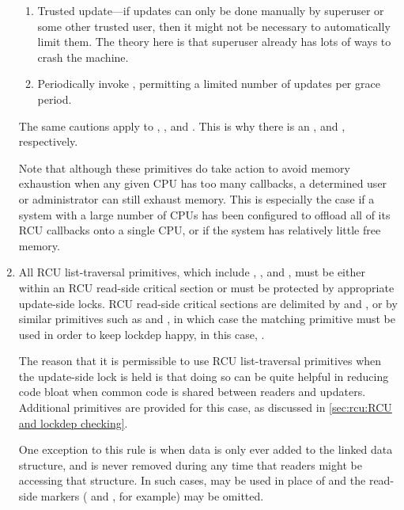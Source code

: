 \begin{enumerate}[start=0]
\begin{enumerate}
	\item	Trusted update---if updates can only be done manually by
		superuser or some other trusted user, then it might not
		be necessary to automatically limit them.
		The theory
		here is that superuser already has lots of ways to crash
		the machine.

	\item	Periodically invoke , permitting a limited
		number of updates per grace period.
	\end{enumerate}

	The same cautions apply to , , and
	.
	This is why there is an ,
	and , respectively.

	Note that although these primitives do take action to avoid
	memory exhaustion when any given CPU has too many callbacks,
	a determined user or administrator can still exhaust memory.
	This is especially the case if a system with a large number of
	CPUs has been configured to offload all of its RCU callbacks onto
	a single CPU, or if the system has relatively little free memory.

\item	All RCU list-traversal primitives, which include
	, , and
	, must be either within an RCU read-side
	critical section or must be protected by appropriate update-side
	locks.
	RCU read-side critical sections are delimited by
	 and , or by similar primitives
	such as  and , in which
	case the matching  primitive must be used in
	order to keep lockdep happy, in this case, .

	The reason that it is permissible to use RCU list-traversal
	primitives when the update-side lock is held is that doing so
	can be quite helpful in reducing code bloat when common code is
	shared between readers and updaters.
	Additional primitives
	are provided for this case, as discussed in
	\cref{sec:rcu:RCU and lockdep checking}.

	One exception to this rule is when data is only ever added to
	the linked data structure, and is never removed during any
	time that readers might be accessing that structure.
	In such
	cases,  may be used in place of 
	and the read-side markers ( and ,
	for example) may be omitted.


\end{enumerate}
